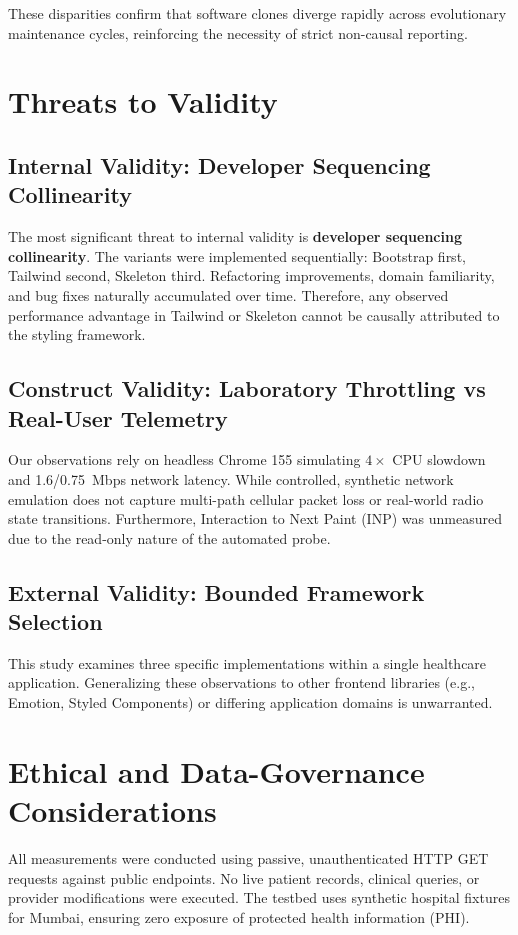 \documentclass[conference]{IEEEtran}
\begin{document}
These disparities confirm that software clones diverge rapidly across evolutionary maintenance cycles, reinforcing the necessity of strict non-causal reporting.

\section{Threats to Validity}

\subsection{Internal Validity: Developer Sequencing Collinearity}
The most significant threat to internal validity is \textbf{developer sequencing collinearity}. The variants were implemented sequentially: Bootstrap first, Tailwind second, Skeleton third. Refactoring improvements, domain familiarity, and bug fixes naturally accumulated over time. Therefore, any observed performance advantage in Tailwind or Skeleton cannot be causally attributed to the styling framework.

\subsection{Construct Validity: Laboratory Throttling vs Real-User Telemetry}
Our observations rely on headless Chrome 155 simulating $4\times$ CPU slowdown and 1.6/0.75~Mbps network latency. While controlled, synthetic network emulation does not capture multi-path cellular packet loss or real-world radio state transitions. Furthermore, Interaction to Next Paint (INP) was unmeasured due to the read-only nature of the automated probe.

\subsection{External Validity: Bounded Framework Selection}
This study examines three specific implementations within a single healthcare application. Generalizing these observations to other frontend libraries (e.g., Emotion, Styled Components) or differing application domains is unwarranted.

\section{Ethical and Data-Governance Considerations}
All measurements were conducted using passive, unauthenticated HTTP GET requests against public endpoints. No live patient records, clinical queries, or provider modifications were executed. The testbed uses synthetic hospital fixtures for Mumbai, ensuring zero exposure of protected health information (PHI).
\end{document}

